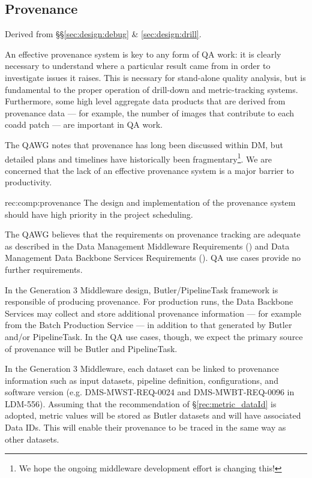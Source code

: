 \subsection{Provenance}
\label{sec:comp:provenance}

Derived from \S\S\ref{sec:design:debug} \& \ref{sec:design:drill}.

An effective provenance system is key to any form of QA work: it is clearly necessary to understand where a particular result came from in order to investigate issues it raises.
This is necssary for stand-alone quality analysis, but is fundamental to the proper operation of drill-down and metric-tracking systems.
Furthermore, some high level aggregate data products that are derived from provenance data --- for example, the number of images that contribute to each coadd patch --- are important in QA work.

The QAWG notes that provenance has long been discussed within DM, but detailed plans and timelines have historically been fragmentary\footnote{We hope the ongoing middleware development effort is changing this!}.
We are concerned that the lack of an effective provenance system is a major barrier to productivity.

\begin{recommendation}
  {rec:comp:provenance}
  {The design and implementation of the provenance system should have
  high priority in the project scheduling.}
\end{recommendation}

The QAWG believes that the requirements on provenance tracking are adequate as described in the Data Management Middleware Requirements () and Data Management Data Backbone Services Requirements ().
QA use cases provide no further requirements.

In the Generation 3 Middleware design, Butler/PipelineTask framework is responsible of producing provenance.
For production runs, the Data Backbone Services may collect and store additional provenance information --- for example from the Batch Production Service --- in addition to that generated by Butler and/or PipelineTask.
In the QA use cases, though, we expect the primary source of provenance will be Butler and PipelineTask.

In the Generation 3 Middleware, each dataset can be linked to provenance information such as input datasets, pipeline definition, configurations, and software version (e.g. DMS-MWST-REQ-0024 and DMS-MWBT-REQ-0096 in LDM-556).
Assuming that the recommendation of \S\ref{rec:metric_dataId} is adopted, \glspl{metric value} will be stored as Butler datasets and will have associated Data IDs.
This will enable their provenance to be traced in the same way as other datasets.

